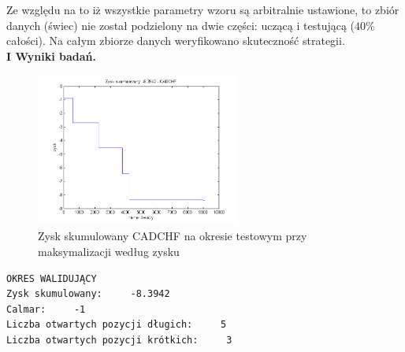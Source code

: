 \documentclass[12pt,a4paper]{article}
\begin{document}
Ze względu na to iż wszystkie parametry wzoru są arbitralnie ustawione, to zbiór danych (świec) nie został podzielony na dwie części: uczącą i testującą ($40\%$ całości). Na całym zbiorze danych weryfikowano skuteczność strategii. \\


\newpage
\noindent \textbf{I Wyniki badań.}\\
\begin{figure}[h!]
\centering
\includegraphics[width = 0.6\textwidth]{MI_CADCHF_S4LS.png}
\caption{Zysk skumulowany CADCHF na okresie testowym przy maksymalizacji według zysku}
\end{figure}
\FloatBarrier
\begin{verbatim}
OKRES WALIDUJĄCY
Zysk skumulowany:     -8.3942
Calmar:     -1
Liczba otwartych pozycji długich:     5
Liczba otwartych pozycji krótkich:     3
\end{verbatim}
\end{document}
